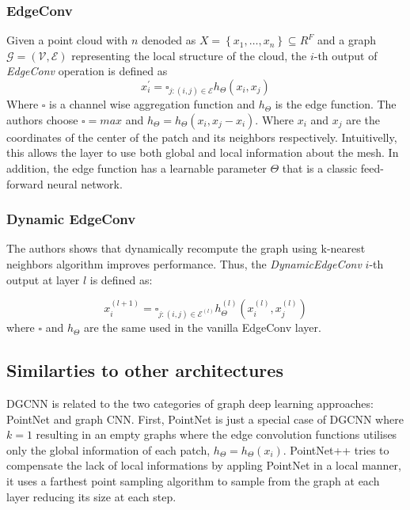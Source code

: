 \documentclass[twocolumn,showpacs,
  nofootinbib,aps,superscriptaddress,
  eqsecnum,prd,notitlepage,showkeys,10pt]{revtex4-1}
\begin{document}
\subsubsection{EdgeConv}
Given a point cloud with $n$ denoded as $X=\left\{x_{1}, \ldots, x_{n}\right\} \subseteq R^{F}$ and a graph $\mathcal{G}=(\mathcal{V}, \mathcal{E})$ representing the local structure of the cloud, the $i$-th output of \emph{EdgeConv} operation is defined as
\begin{equation}
  x_{i}^{\prime}=\square_{j :(i, j) \in \mathcal{E}} h_{\Theta}\left(x_{i}, x_{j}\right)
  \end{equation}
Where $\square$ is a channel wise aggregation function and $h_{\Theta}$ is the edge function. The authors choose $\square=max$ and $h_{\Theta} = h_{\Theta}(x_i, x_j - x_i)$. Where $x_i$ and $x_j$ are the coordinates of the center of the patch and its neighbors respectively. Intuitivelly, this allows the layer to use both global and local information about the mesh. In addition, the edge function has a learnable parameter $\Theta$ that is a classic feed-forward neural network. 
\subsubsection{Dynamic EdgeConv}
The authors shows that dynamically recompute the graph using k-nearest neighbors algorithm improves performance. Thus, the \emph{DynamicEdgeConv} $i$-th output at layer $l$ is defined as:

\begin{equation}
  x_{i}^{(l+1)}=\square_{j :(i, j) \in \mathcal{E}^{(l)}} h_{\Theta}^{(l)}\left(x_{i}^{(l)}, x_{j}^{(l)}\right)
\end{equation}
where $\square$ and $h_{\Theta}$ are the same used in the vanilla EdgeConv layer.
\subsection{Similarties to other architectures}


DGCNN is related to the two categories of graph deep learning  approaches: PointNet and graph CNN.
First, PointNet is just a special case of DGCNN where $k=1$ resulting in an empty graphs where the edge convolution functions utilises only the global information of each patch, $h_{\Theta} = h_{\Theta}(x_i)$.
PointNet++ \cite{pointnet_plus} tries to compensate the lack of local informations by appling PointNet in a local manner, it uses a farthest point sampling algorithm to sample from the graph at each layer reducing its size at each step.
\end{document}
